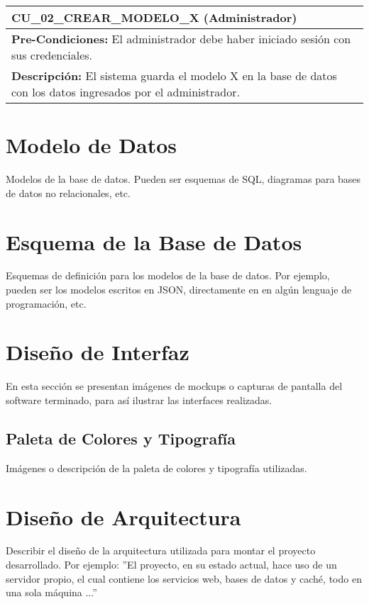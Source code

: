 \begin{center}
  \begin{tabular}{| p{7.5cm} | p{7.5cm} |}
    \hline
    \multicolumn{2}{|p{15cm}|}{\textbf{CU\_02\_CREAR\_MODELO\_X} (Administrador)} \\ \hline
    \multicolumn{2}{|p{15cm}|}{\textbf{Pre-Condiciones:} El administrador debe haber iniciado sesión con sus credenciales.} \\ \hline
    \multicolumn{2}{|p{15cm}|}{\textbf{Descripción:} El sistema guarda el modelo X en la base de datos con los datos ingresados por el administrador. } \\
    \hline
  \end{tabular}
  
  \label{table:usecase:3}
\end{center}

\section{Modelo de Datos}
Modelos de la base de datos. Pueden ser esquemas de SQL, diagramas para bases de datos no relacionales, etc.

\section{Esquema de la Base de Datos}
Esquemas de definición para los modelos de la base de datos. Por ejemplo, pueden ser los modelos escritos en JSON, directamente en  en algún lenguaje de programación, etc.

\section{Diseño de Interfaz}
En esta sección se presentan imágenes de mockups o capturas de pantalla del software terminado, para así ilustrar las interfaces realizadas.

\subsection{Paleta de Colores y Tipografía}
Imágenes o descripción de la paleta de colores y tipografía utilizadas.

\newpage

\section{Diseño de Arquitectura}
Describir el diseño de la arquitectura utilizada para montar el proyecto desarrollado. Por ejemplo: ''El proyecto, en su estado actual, hace uso de un servidor propio, el cual contiene los servicios web, bases de datos y caché, todo en una sola máquina ...''

